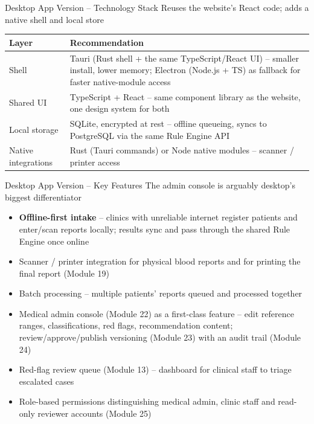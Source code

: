 \documentclass[9pt,aspectratio=169]{beamer}
\begin{document}
\begin{frame}[t]{Desktop App Version -- Technology Stack}
\textcolor{black!55}{\scriptsize Reuses the website's React code; adds a native shell and local store}\\[2pt]
\begin{center}\scriptsize
\begin{tabular}{p{3.6cm}p{9.5cm}}
\toprule
\textbf{Layer} & \textbf{Recommendation} \\
\midrule
Shell & Tauri (Rust shell + the same TypeScript/React UI) -- smaller install, lower memory; Electron (Node.js + TS) as fallback for faster native-module access \\
Shared UI & TypeScript + React -- same component library as the website, one design system for both \\
Local storage & SQLite, encrypted at rest -- offline queueing, syncs to PostgreSQL via the same Rule Engine API \\
Native integrations & Rust (Tauri commands) or Node native modules -- scanner / printer access \\
\bottomrule
\end{tabular}
\end{center}
\end{frame}

\begin{frame}[t]{Desktop App Version -- Key Features}
\textcolor{black!55}{\scriptsize The admin console is arguably desktop's biggest differentiator}\\[2pt]
\begin{itemize}
\scriptsize
\item \textbf{Offline-first intake} -- clinics with unreliable internet register patients and enter/scan reports locally; results sync and pass through the shared Rule Engine once online
\item Scanner / printer integration for physical blood reports and for printing the final report (Module 19)
\item Batch processing -- multiple patients' reports queued and processed together
\item Medical admin console (Module 22) as a first-class feature -- edit reference ranges, classifications, red flags, recommendation content; review/approve/publish versioning (Module 23) with an audit trail (Module 24)
\item Red-flag review queue (Module 13) -- dashboard for clinical staff to triage escalated cases
\item Role-based permissions distinguishing medical admin, clinic staff and read-only reviewer accounts (Module 25)
\end{itemize}
\end{frame}
\end{document}
